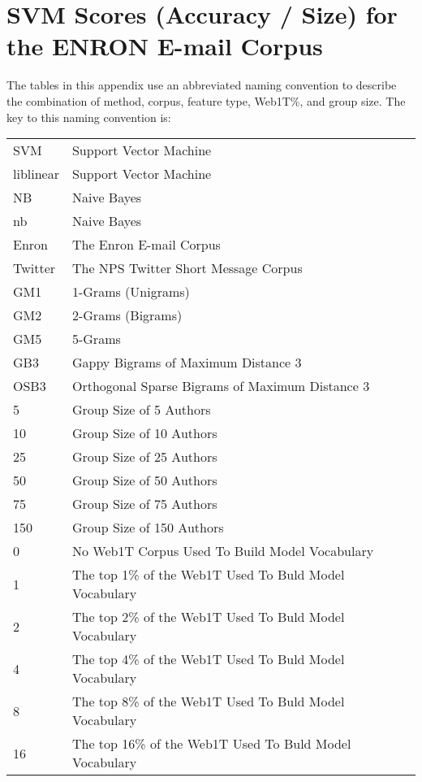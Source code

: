 \chapter{SVM Scores (Accuracy / Size) for the ENRON E-mail Corpus}


The tables in this appendix use an abbreviated naming convention to describe the combination of method, corpus, feature type, Web1T\%, and group size.  The key to this naming convention is:

\begin{center}
\begin{table}[htbp!]
	\begin{center}
	\begin{tabular}{ll}
	SVM & Support Vector Machine\\
	liblinear & Support Vector Machine\\
	NB & Naive Bayes\\
	nb & Naive Bayes\\
	
	Enron & The Enron E-mail Corpus\\
	Twitter & The NPS Twitter Short Message Corpus\\
	
	GM1 & 1-Grams (Unigrams)\\
	GM2 & 2-Grams (Bigrams)\\
	GM5 & 5-Grams\\
	GB3 & Gappy Bigrams of Maximum Distance 3\\
	OSB3 & Orthogonal Sparse Bigrams of Maximum Distance 3\\
		
	5 & Group Size of 5 Authors\\
	10 & Group Size of 10 Authors\\
	25 & Group Size of 25 Authors\\
	50 & Group Size of 50 Authors\\
	75 & Group Size of 75 Authors\\
	150 & Group Size of 150 Authors\\
	
	0 & No Web1T Corpus Used To Build Model Vocabulary\\
	1 & The top 1\% of the Web1T Used To Buld Model Vocabulary\\
	2 & The top 2\% of the Web1T Used To Buld Model Vocabulary\\
	4 & The top 4\% of the Web1T Used To Buld Model Vocabulary\\
	8 & The top 8\% of the Web1T Used To Buld Model Vocabulary\\
	16 & The top 16\% of the Web1T Used To Buld Model Vocabulary\\
	\end{tabular}
	\end{center}
\end{table}
\end{center}



